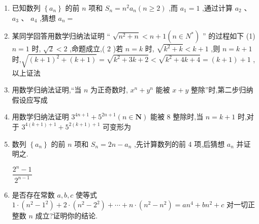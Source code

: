 \begin{enumerate}
    \item 已知数列 $\left\{  {a}_{n}\right\}$ 的前 $n$ 项和 ${S}_{n} = {n}^{2}{a}_{n}\left( {n \geq  2}\right)$ ,而 ${a}_{1} = 1$ ,通过计算 ${a}_{2}$ 、 ${a}_{3}$ 、 ${a}_{4}$ ,猜想 ${a}_{n} =$      
    \item 某同学回答用数学归纳法证明 “ $\sqrt{{n}^{2} + n} < n + 1\left( {n \in  {N}^{ * }}\right)$ ” 的过程如下 (1) $n = 1$ 时, $\sqrt{2} < 2$ ,命题成立,( 2 )若 $n= k$ 时, $\sqrt{{k}^{2} + k} < k + 1$ ,则 $n= k + 1$ 时,$\sqrt{{\left( k + 1\right) }^{2} + \left( {k + 1}\right) } = \sqrt{{k}^{2} + 3k + 2} < \sqrt{{k}^{2} + 4k + 4} = \left( {k + 1}\right)  + 1$ ,以上证法     
    \item 用数学归纳法证明,“当 $n$ 为正奇数时, ${x}^{n} + {y}^{n}$ 能被 $x + y$ 整除”时,第二步归纳假设应写成     
    \item 用数学归纳法证明 ${3}^{{4n} + 1} + {5}^{{2n} + 1}\left( {n \in  \mathbf{N}}\right)$ 能被 8 整除时,当 $n = k + 1$ 时,对于 ${3}^{4\left( {k + 1}\right)  + 1} + {5}^{2\left( {k + 1}\right)  + 1}$ 可变形为     
    \item 数列 $\left\{  {a}_{n}\right\}$ 的前 $n$ 项和 ${S}_{n} = {2n} - {a}_{n}$ ,先计算数列的前 4 项,后猜想 ${a}_{n}$ 并证明之.
    \begin{jieda}
        $\dfrac{2^n - 1}{2^{n-1}}$
    \end{jieda}
    \item 是否存在常数 $a,b,c$ 使等式 $1 \cdot  \left( {{n}^{2} - {1}^{2}}\right)  + 2 \cdot  \left( {{n}^{2} - {2}^{2}}\right)  + \cdots  + n \cdot  \left( {{n}^{2} - {n}^{2}}\right)  = a{n}^{4} + b{n}^{2} + c$ 对一切正整数 $n$ 成立?证明你的结论.

\end{enumerate}
